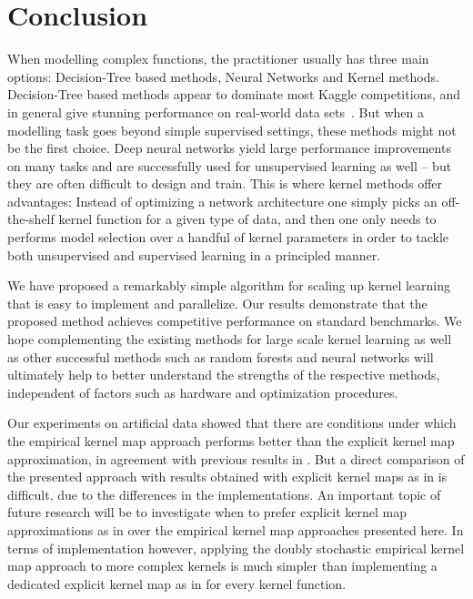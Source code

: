 \documentclass{article} %
\begin{document}
\section{Conclusion}
When modelling complex functions, the practitioner usually has three main options: Decision-Tree based methods, Neural Networks and Kernel methods. Decision-Tree based methods appear to dominate most Kaggle competitions, and in general give stunning performance on real-world data sets~\cite{Caruana2006}. But when a modelling task goes beyond simple supervised settings, these methods might not be the first choice. Deep neural networks yield large performance improvements on many tasks and are successfully used for unsupervised learning as well -- but they are often difficult to design and train. 
This is where kernel methods offer advantages: Instead of optimizing a network architecture one simply picks an off-the-shelf kernel function for a given type of data, and then one only needs to performs model selection over a handful of kernel parameters in order to tackle both unsupervised and supervised learning in a principled manner.

We have proposed a remarkably simple algorithm for scaling up kernel learning that is easy to implement and parallelize. Our results demonstrate that the proposed method achieves competitive performance on standard benchmarks. We hope complementing the existing methods for large scale kernel learning as well as other successful methods such as random forests and neural networks will ultimately help to better understand the strengths of the respective methods, independent of factors such as hardware and optimization procedures. 

Our experiments on artificial data showed that there are conditions under which the empirical kernel map approach performs better than the explicit kernel map approximation, in agreement with previous results in \cite{Vedaldi2010}. But a direct comparison of the presented approach with results obtained with explicit kernel maps as in \cite{Dai2014} is difficult, due to the differences in the implementations. An important topic of future research will be to investigate when to prefer explicit kernel map approximations as in \cite{Rahimi2008, Dai2014} over the empirical kernel map approaches presented here. In terms of implementation however, applying the doubly stochastic empirical kernel map approach to more complex kernels is much simpler than implementing a dedicated explicit kernel map as in \cite{Dai2014} for every kernel function. 
\end{document}
